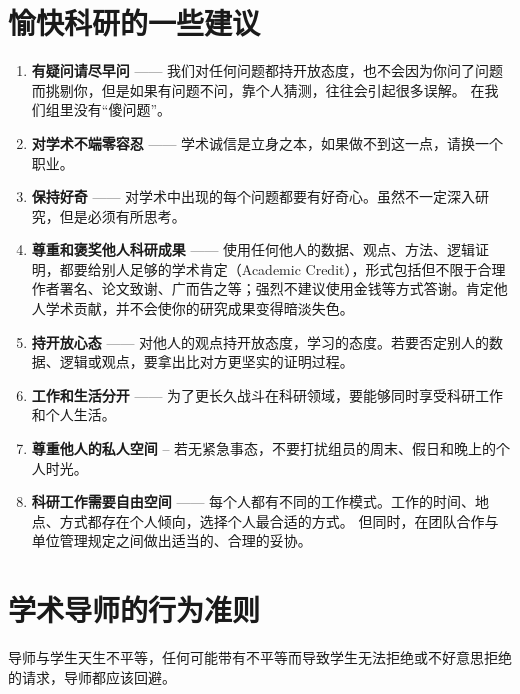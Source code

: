 \documentclass[
]{book}
\begin{document}
\hypertarget{ux6109ux5febux79d1ux7814ux7684ux4e00ux4e9bux5efaux8bae}{%
\section{愉快科研的一些建议}\label{ux6109ux5febux79d1ux7814ux7684ux4e00ux4e9bux5efaux8bae}}

\begin{enumerate}
\def\labelenumi{\arabic{enumi}.}
\item
  \textbf{有疑问请尽早问} ------
  我们对任何问题都持开放态度，也不会因为你问了问题而挑剔你，但是如果有问题不问，靠个人猜测，往往会引起很多误解。
  在我们组里没有``傻问题''。
\item
  \textbf{对学术不端零容忍} ------ 学术诚信是立身之本，如果做不到这一点，请换一个职业。
\item
  \textbf{保持好奇} ------ 对学术中出现的每个问题都要有好奇心。虽然不一定深入研究，但是必须有所思考。
\item
  \textbf{尊重和褒奖他人科研成果} ------
  使用任何他人的数据、观点、方法、逻辑证明，都要给别人足够的学术肯定（Academic Credit），形式包括但不限于合理作者署名、论文致谢、广而告之等；强烈不建议使用金钱等方式答谢。肯定他人学术贡献，并不会使你的研究成果变得暗淡失色。
\item
  \textbf{持开放心态} ------
  对他人的观点持开放态度，学习的态度。若要否定别人的数据、逻辑或观点，要拿出比对方更坚实的证明过程。
\item
  \textbf{工作和生活分开} ------
  为了更长久战斗在科研领域，要能够同时享受科研工作和个人生活。
\item
  \textbf{尊重他人的私人空间} --
  若无紧急事态，不要打扰组员的周末、假日和晚上的个人时光。
\item
  \textbf{科研工作需要自由空间} ------
  每个人都有不同的工作模式。工作的时间、地点、方式都存在个人倾向，选择个人最合适的方式。 但同时，在团队合作与单位管理规定之间做出适当的、合理的妥协。
\end{enumerate}

\hypertarget{ux5b66ux672fux5bfcux5e08ux7684ux884cux4e3aux51c6ux5219}{%
\section{学术导师的行为准则}\label{ux5b66ux672fux5bfcux5e08ux7684ux884cux4e3aux51c6ux5219}}

导师与学生天生不平等，任何可能带有不平等而导致学生无法拒绝或不好意思拒绝的请求，导师都应该回避。
\end{document}
